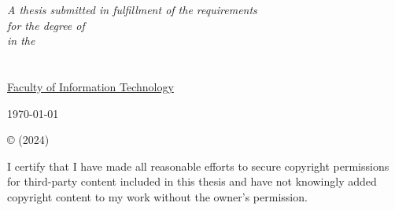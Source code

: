 \documentclass[
11pt, %
english, %
singlespacing, %
headsepline, %
]{MastersDoctoralThesis} %
\begin{document}
\begin{titlepage}
\begin{center}
\vfill

\large \textit{A thesis submitted in fulfillment of the requirements\\ for the degree of \degreename}\\[0.3cm] %
\textit{in the}\\[0.4cm]
\groupname\\\deptname\\ %
\href{http://abc.com}{Faculty of Information Technology}\\[2cm]
 
\vfill

{\large \today}\\[4cm] %
 
\vfill
\end{center}
\end{titlepage}

\begin{copyright}
	
	© \authorname  (2024)
	
	I certify that I have made all reasonable efforts to secure copyright permissions for third-party content included in this thesis and have not knowingly added copyright content
to my work without the owner’s permission.
	
\end{copyright}

\end{document}
